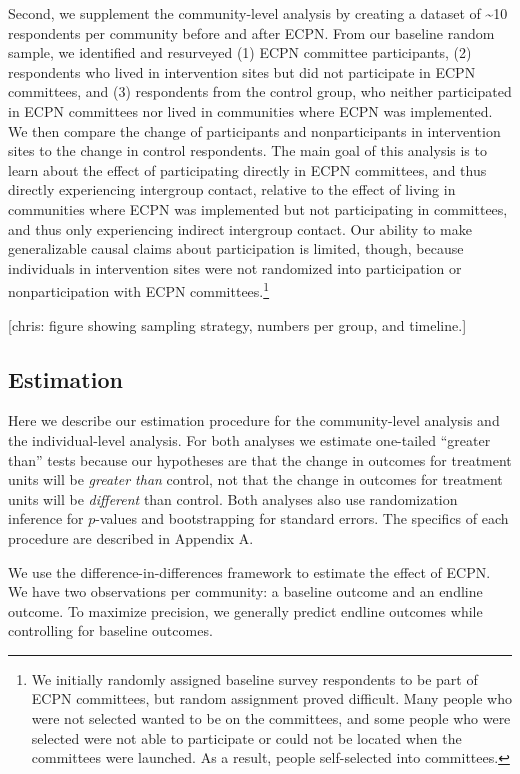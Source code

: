 \documentclass[11pt]{article}
\begin{document}
Second, we supplement the community-level analysis by creating a dataset
of \textasciitilde{}10 respondents per community before and after ECPN.
From our baseline random sample, we identified and resurveyed (1) ECPN
committee participants, (2) respondents who lived in intervention sites
but did not participate in ECPN committees, and (3) respondents from the
control group, who neither participated in ECPN committees nor lived in
communities where ECPN was implemented. We then compare the change of
participants and nonparticipants in intervention sites to the change in
control respondents. The main goal of this analysis is to learn about
the effect of participating directly in ECPN committees, and thus
directly experiencing intergroup contact, relative to the effect of
living in communities where ECPN was implemented but not participating
in committees, and thus only experiencing indirect intergroup contact.
Our ability to make generalizable causal claims about participation is
limited, though, because individuals in intervention sites were not
randomized into participation or nonparticipation with ECPN
committees.\footnote{We initially randomly assigned baseline survey
  respondents to be part of ECPN committees, but random assignment
  proved difficult. Many people who were not selected wanted to be on
  the committees, and some people who were selected were not able to
  participate or could not be located when the committees were launched.
  As a result, people self-selected into committees.}

{[}chris: figure showing sampling strategy, numbers per group, and
timeline.{]}

\hypertarget{estimation}{%
\subsection{Estimation}\label{estimation}}

Here we describe our estimation procedure for the community-level
analysis and the individual-level analysis. For both analyses we
estimate one-tailed ``greater than'' tests because our hypotheses are
that the change in outcomes for treatment units will be \emph{greater
than} control, not that the change in outcomes for treatment units will
be \emph{different} than control. Both analyses also use randomization
inference for \(p\)-values and bootstrapping for standard errors. The
specifics of each procedure are described in Appendix A.

We use the difference-in-differences framework to estimate the effect of
ECPN. We have two observations per community: a baseline outcome and an
endline outcome. To maximize precision, we generally predict endline
outcomes while controlling for baseline outcomes.
\end{document}

